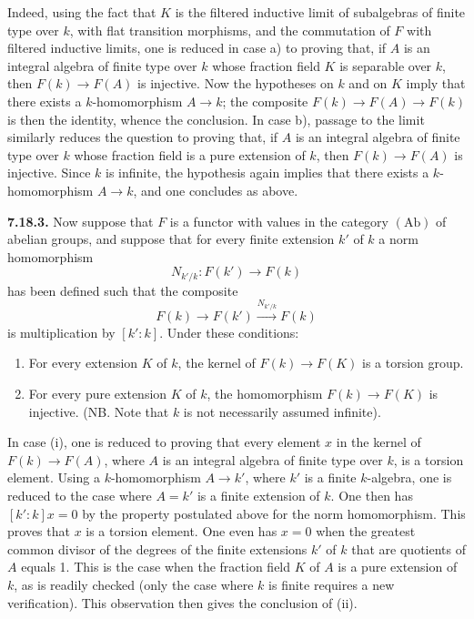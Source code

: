 Indeed, using the fact that \(K\) is the filtered inductive limit of subalgebras of finite type over \(k\), with flat transition morphisms, and the commutation of \(F\) with filtered inductive limits, one is reduced in case a) to proving that, if \(A\) is an integral algebra of finite type over \(k\) whose fraction field \(K\) is separable over \(k\), then \(F(k)\to F(A)\) is injective. Now the hypotheses on \(k\) and on \(K\) imply that there exists a \(k\)-homomorphism \(A\to k\); the composite \(F(k)\to F(A)\to F(k)\) is then the identity, whence the conclusion. In case b), passage to the limit similarly reduces the question to proving that, if \(A\) is an integral algebra of finite type over \(k\) whose fraction field is a pure extension of \(k\), then \(F(k)\to F(A)\) is injective. Since \(k\) is infinite, the hypothesis again implies that there exists a \(k\)-homomorphism \(A\to k\), and one concludes as above.

\textbf{7.18.3.} Now suppose that \(F\) is a functor with values in the category \((\mathrm{Ab})\) of abelian groups, and suppose that for every finite extension \(k'\) of \(k\) a norm homomorphism
\[
  N_{k'/k}:F(k')\longrightarrow F(k)
\]
has been defined such that the composite
\[
  F(k)\longrightarrow F(k')\xrightarrow{N_{k'/k}}F(k)
\]
is multiplication by \([k':k]\). Under these conditions:
\begin{enumerate}[label=(\roman*)]

\item
{}%
For every extension \(K\) of \(k\), the kernel of \(F(k)\to F(K)\) is a torsion group.
\item For every pure extension \(K\) of \(k\), the homomorphism \(F(k)\to F(K)\) is injective. (NB. Note that \(k\) is not necessarily assumed infinite).
\end{enumerate}

In case (i), one is reduced to proving that every element \(x\) in the kernel of \(F(k)\to F(A)\), where \(A\) is an integral algebra of finite type over \(k\), is a torsion element. Using a \(k\)-homomorphism \(A\to k'\), where \(k'\) is a finite \(k\)-algebra, one is reduced to the case where \(A=k'\) is a finite extension of \(k\). One then has \([k':k]x=0\) by the property postulated above for the norm homomorphism. This proves that \(x\) is a torsion element. One even has \(x=0\) when the greatest common divisor of the degrees of the finite extensions \(k'\) of \(k\) that are quotients of \(A\) equals 1. This is the case when the fraction field \(K\) of \(A\) is a pure extension of \(k\), as is readily checked (only the case where \(k\) is finite requires a new verification). This observation then gives the conclusion of (ii).


